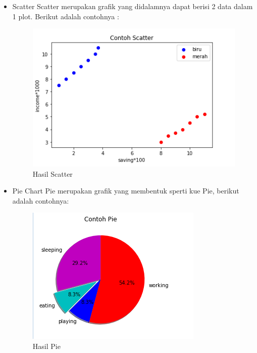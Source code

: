 \begin{itemize} 
    \item Scatter\newline
    Scatter merupakan grafik yang didalamnya dapat berisi 2 data dalam 1 plot.\newline
    Berikut adalah contohnya :

    

\begin{figure}[h]
\centering
\includegraphics[scale=0.5]{figures/6/Teori/1174051/4.png}
\caption{Hasil Scatter}
\label{fig:contoh}
\end{figure}
\end{itemize}

\begin{itemize}
    \item Pie\newline
    Chart Pie merupakan grafik yang membentuk sperti kue Pie, berikut adalah contohnya:
    
    

\begin{figure}[h]
\centering
\includegraphics[scale=0.6]{figures/6/Teori/1174051/5.png}
\caption{Hasil Pie}
\label{fig:contoh Pie}
\end{figure}


\end{itemize}

